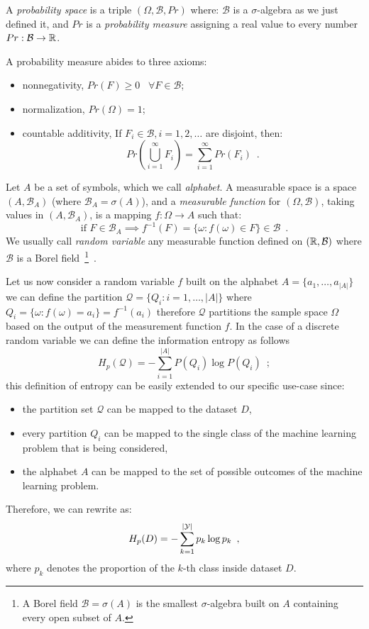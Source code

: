 A \emph{probability space} is a triple $(\Omega, \mathcal{B}, Pr)$ where: $\mathcal{B}$ is a
$\sigma$-algebra as we just defined it, and $Pr$ is a \emph{probability measure} assigning a real value to every number $Pr: \mathcal{B} \rightarrow \mathbb{R}$.

A probability measure abides to three axioms:
\begin{itemize}
	\item nonnegativity, $Pr(F) \geq 0 \hspace{10pt} \forall F \in \mathcal{B}$;
	\item normalization, $Pr(\Omega) = 1$;
	\item countable additivity, If $F_i \in \mathcal{B}, i = 1, 2, \ldots$ are disjoint, then:
		\[Pr\left(\bigcup_{i = 1}^\infty{F_i}\right) = \sum_{i = 1}^\infty{Pr(F_i)} \enspace.\]
\end{itemize}

Let $A$ be a set of symbols, which we call \emph{alphabet}. A measurable space is a space $(A,
\mathcal{B}_A)$ (where $\mathcal{B}_A = \sigma(A)$), and a \emph{measurable function} for $(\Omega,
\mathcal{B})$, taking values in $(A, \mathcal{B}_A)$, is a mapping $f: \Omega \rightarrow A$ such
that: 
\[\text{if } F \in \mathcal{B}_A \implies f^ {-1}(F) = \{\omega: f(\omega) \in F\} \in \mathcal{B}
\enspace.\] 
We usually call \emph{random variable} any measurable function defined on $(\mathbb{R}, \mathcal{B})$ where
$\mathcal{B}$ is a Borel field~\footnote{
	A Borel field $\mathcal{B} = \sigma(A)$ is the smallest $\sigma$-algebra built on $A$
	containing every open subset of $A$.
}~\cite{gray2011entropy}.

Let us now consider a random variable $f$ built on the alphabet $A = \{a_1, \ldots, a_{|A|}\}$ we
can define the partition $\mathcal{Q} = \{Q_i: i = 1, \ldots, |A|\}$ where $Q_i = \{\omega:
f(\omega) = a_i\} = f^{-1}(a_i)$ therefore $\mathcal{Q}$ partitions the sample space $\Omega$ based
on the output of the measurement function $f$. In the case of a discrete random variable we can define the information entropy as follows
\begin{equation}
	\label{eq:information-entropy}
	H_p(\mathcal{Q}) = - \sum_{i = 1}^{|A|}{P(Q_i)\log{P(Q_i)}} \enspace;
\end{equation}
this definition of entropy can be easily extended to our specific use-case since:
\begin{itemize}
	\item the partition set $\mathcal{Q}$ can be mapped to the dataset $D$,
	\item every partition $Q_i$ can be mapped to the single class of the machine learning
	      problem that is being considered,
	\item the alphabet $A$ can be mapped to the set of possible outcomes of the machine learning
	      problem.
\end{itemize}
Therefore, we can rewrite  as:
\begin{equation}
	H_p(D) = - \sum_{k = 1}^{|\mathcal{Y}|}p_k \log{p_k} \enspace,
\end{equation}
where $p_k$ denotes the proportion of the $k$-th class inside dataset $D$.

